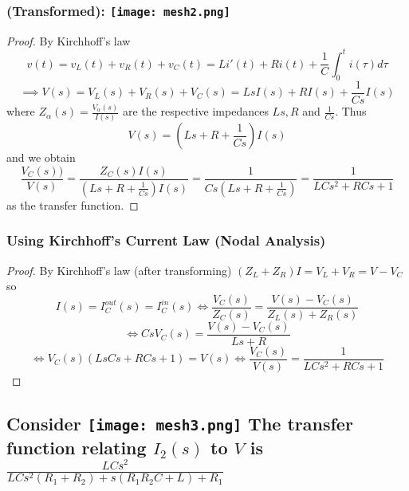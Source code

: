 \documentclass[11pt]{article}
\begin{document}
\subsubsection{(Transformed): \newline
	\texttt{[image: mesh2.png]} }
\begin{proof}
	By Kirchhoff's law
	\[v(t) = v_L(t) + v_R(t) + v_C(t) = L i'(t) + Ri(t) + \frac{1}{C} \int_0^t i(\tau) d\tau \]
	\[\implies V(s) = V_L(s) + V_R(s)+ V_C(s) =  LsI(s) + RI(s) + \frac{1}{Cs}I(s) \]
	where $Z_{\alpha}(s) = \frac{V_{\alpha}(s)}{I(s)}$ are the respective impedances $Ls, R$ and $\frac{1}{Cs}$. Thus 
	\[V(s) = (Ls + R+ \frac{1}{Cs})I(s)\]
	and we obtain
	\[\frac{V_C(s))}{V(s)} = \frac{Z_C(s)I(s)}{(Ls + R+ \frac{1}{Cs})I(s)} =  \frac{1}{Cs (Ls + R+ \frac{1}{Cs})} = \frac{1}{LCs^2 + RCs + 1}\] as the transfer function. 
\end{proof}

\subsubsection{Using Kirchhoff's Current Law (Nodal Analysis)}
\begin{proof}
	By Kirchhoff's law (after transforming) $(Z_L + Z_R)I = V_L + V_R = V - V_C$ so
	\[I(s) = I_C^{out}(s) = I_C^{in}(s) \iff  \frac{V_C(s)}{Z_C(s)} = \frac{V(s) - V_C(s)}{Z_L(s) + Z_R(s) } \] 
	\[\iff CsV_C(s) = \frac{V(s) - V_C(s)}{Ls + R}\]
	\[\iff V_C(s) (LsCs + RCs + 1) = V(s) \iff \frac{V_C(s)}{V(s)} = \frac{1}{LCs^2 + RCs + 1}\]
\end{proof}

\subsection{Consider \newline \texttt{[image: mesh3.png]} The transfer function relating $I_2(s)$ to $V$ is $\frac{LCs^2}{LCs^2(R_1 + R_2) + s(R_1R_2C + L) + R_1}$}
\end{document}
